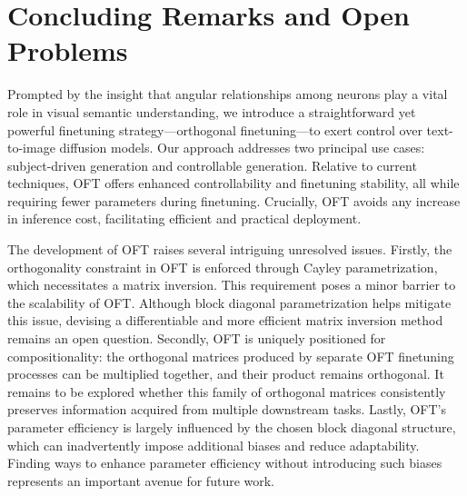 \section{Concluding Remarks and Open Problems}

Prompted by the insight that angular relationships among neurons play a vital role in visual semantic understanding, we introduce a straightforward yet powerful finetuning strategy—orthogonal finetuning—to exert control over text-to-image diffusion models. Our approach addresses two principal use cases: subject-driven generation and controllable generation. Relative to current techniques, OFT offers enhanced controllability and finetuning stability, all while requiring fewer parameters during finetuning. Crucially, OFT avoids any increase in inference cost, facilitating efficient and practical deployment.

The development of OFT raises several intriguing unresolved issues. Firstly, the orthogonality constraint in OFT is enforced through Cayley parametrization, which necessitates a matrix inversion. This requirement poses a minor barrier to the scalability of OFT. Although block diagonal parametrization helps mitigate this issue, devising a differentiable and more efficient matrix inversion method remains an open question. Secondly, OFT is uniquely positioned for compositionality: the orthogonal matrices produced by separate OFT finetuning processes can be multiplied together, and their product remains orthogonal. It remains to be explored whether this family of orthogonal matrices consistently preserves information acquired from multiple downstream tasks. Lastly, OFT's parameter efficiency is largely influenced by the chosen block diagonal structure, which can inadvertently impose additional biases and reduce adaptability. Finding ways to enhance parameter efficiency without introducing such biases represents an important avenue for future work.

